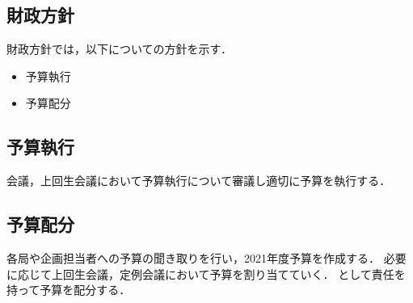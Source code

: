 \subsection*{財政方針}


財政方針では，以下についての方針を示す．
\begin{itemize}
  \item 予算執行
  \item 予算配分
\end{itemize}

\subsection*{予算執行}
\kaikeiDepartment{}会議，上回生会議において予算執行について審議し適切に予算を執行する．

\subsection*{予算配分}
各局や企画担当者への予算の聞き取りを行い，2021年度予算を作成する．
必要に応じて上回生会議，定例会議において予算を割り当てていく．
\kaikeiDepartment{}として責任を持って予算を配分する．
